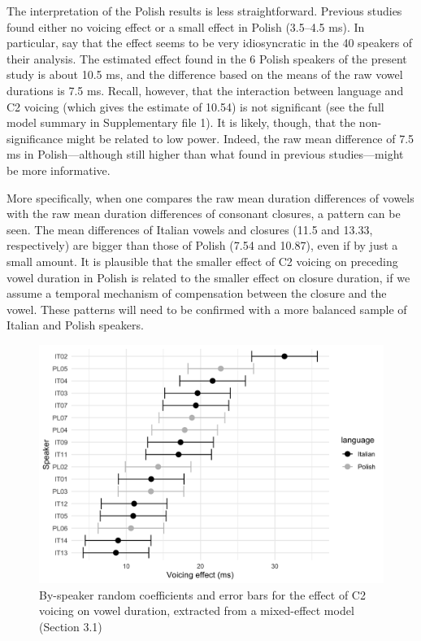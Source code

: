\documentclass[charis]{glossa}
\begin{document}
The interpretation of the Polish results is less straightforward.
Previous studies found either no voicing effect or a small effect in
Polish (3.5--4.5 ms). In particular, \citet{malisz2008} say that the
effect seems to be very idiosyncratic in the 40 speakers of their
analysis. The estimated effect found in the 6 Polish speakers of the
present study is about 10.5 ms, and the difference based on the means of
the raw vowel durations is 7.5 ms. Recall, however, that the interaction
between language and C2 voicing (which gives the estimate of 10.54) is
not significant (see the full model summary in Supplementary file 1). It
is likely, though, that the non-significance might be related to low
power. Indeed, the raw mean difference of 7.5 ms in Polish---although
still higher than what found in previous studies---might be more
informative.

More specifically, when one compares the raw mean duration differences
of vowels with the raw mean duration differences of consonant closures,
a pattern can be seen. The mean differences of Italian vowels and
closures (11.5 and 13.33, respectively) are bigger than those of Polish
(7.54 and 10.87), even if by just a small amount. It is plausible that
the smaller effect of C2 voicing on preceding vowel duration in Polish
is related to the smaller effect on closure duration, if we assume a
temporal mechanism of compensation between the closure and the vowel.
These patterns will need to be confirmed with a more balanced sample of
Italian and Polish speakers.

\begin{figure}
\includegraphics[width=\linewidth]{./Figure6-1} \caption{By-speaker random coefficients and error bars for the effect of C2 voicing on vowel duration, extracted from a mixed-effect model (Section 3.1)}\label{f:Figure6}
\end{figure}
\end{document}
